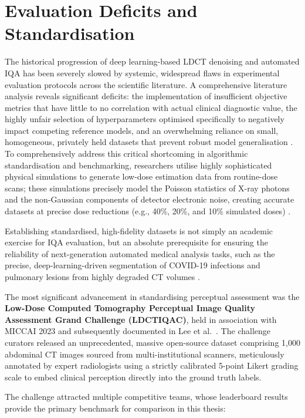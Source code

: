 \section{Evaluation Deficits and Standardisation}
\label{sec:lit_standardisation}

The historical progression of deep learning-based LDCT denoising and automated IQA has
been severely slowed by systemic, widespread flaws in experimental evaluation protocols
across the scientific literature. A comprehensive literature analysis reveals significant
deficits: the implementation of insufficient objective metrics that have little to no
correlation with actual clinical diagnostic value, the highly unfair selection of
hyperparameters optimised specifically to negatively impact competing reference models,
and an overwhelming reliance on small, homogeneous, privately held datasets that prevent
robust model generalisation \cite{mccollough2020ldct}. To comprehensively address this
critical shortcoming in algorithmic standardisation and benchmarking, researchers utilise
highly sophisticated physical simulations to generate low-dose estimation data from
routine-dose scans; these simulations precisely model the Poisson statistics of X-ray
photons and the non-Gaussian components of detector electronic noise, creating accurate
datasets at precise dose reductions (e.g., 40\%, 20\%, and 10\% simulated doses)
\cite{zabic2013simulation}.

Establishing standardised, high-fidelity datasets is not simply an academic exercise for
IQA evaluation, but an absolute prerequisite for ensuring the reliability of
next-generation automated medical analysis tasks, such as the precise, deep-learning-driven
segmentation of COVID-19 infections and pulmonary lesions from highly degraded CT volumes
\cite{sori2021dfdnet}.

The most significant advancement in standardising perceptual assessment was the
\textbf{Low-Dose Computed Tomography Perceptual Image Quality Assessment Grand Challenge
(LDCTIQAC)}, held in association with MICCAI 2023 and subsequently documented in Lee
et al.\ \cite{lee2025ldctiqac}. The challenge curators released an unprecedented,
massive open-source dataset comprising 1,000 abdominal CT images sourced from
multi-institutional scanners, meticulously annotated by expert radiologists using a
strictly calibrated 5-point Likert grading scale to embed clinical perception directly
into the ground truth labels.

The challenge attracted multiple competitive teams, whose leaderboard results provide the
primary benchmark for comparison in this thesis:

